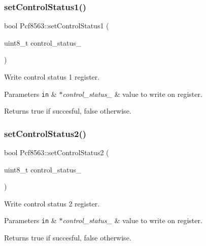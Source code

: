 \subsubsection{\texorpdfstring{set\+Control\+Status1()}{setControlStatus1()}}
{\footnotesize\ttfamily bool Pcf8563\+::set\+Control\+Status1 (\begin{DoxyParamCaption}\item[{uint8\+\_\+t}]{control\+\_\+status\+\_ }\end{DoxyParamCaption})}



Write control status 1 register. 


\begin{DoxyParams}[1]{Parameters}
\mbox{\tt in}  & {\em $\ast$control\+\_\+status\+\_} & value to write on register. \\
\hline
\end{DoxyParams}
\begin{DoxyReturn}{Returns}
true if succesful, false otherwise. 
\end{DoxyReturn}
\mbox{\label{namespacePcf8563_ac23ff9ec298a4ec5a777139d972b5e4b}} 
\subsubsection{\texorpdfstring{set\+Control\+Status2()}{setControlStatus2()}}
{\footnotesize\ttfamily bool Pcf8563\+::set\+Control\+Status2 (\begin{DoxyParamCaption}\item[{uint8\+\_\+t}]{control\+\_\+status\+\_ }\end{DoxyParamCaption})}



Write control status 2 register. 


\begin{DoxyParams}[1]{Parameters}
\mbox{\tt in}  & {\em $\ast$control\+\_\+status\+\_} & value to write on register. \\
\hline
\end{DoxyParams}
\begin{DoxyReturn}{Returns}
true if succesful, false otherwise. 
\end{DoxyReturn}
\mbox{\label{namespacePcf8563_aa8a735e59aae37d9184b17cb84de4f85}} 
